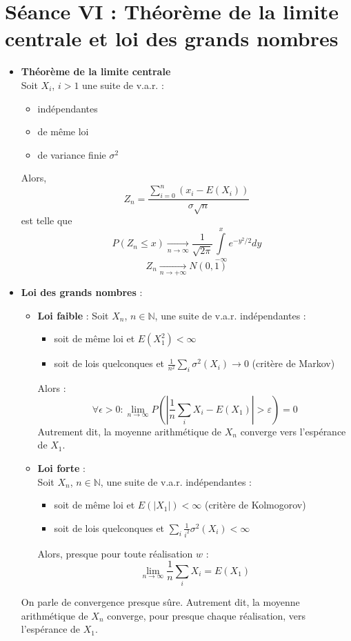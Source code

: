\documentclass[a4paper,11pt]{report}
\begin{document}
\section{Séance VI : Théorème de la limite centrale et loi des grands nombres}
\begin{itemize}
	\item \textbf{Théorème de la limite centrale} \\
	Soit $X_i$, $i>1$ une suite de v.a.r. :
	\begin{itemize}
		\item indépendantes
		\item de même loi
		\item de variance finie $\sigma^2$
	\end{itemize}
	Alors,
	\[
		Z_n = \frac{\sum\limits_{i=0}^{n}{(x_i-E(X_i))}}{\sigma\sqrt{n}}
	\]
	est telle que
	\[
		P(Z_n \le x) \underset{n\rightarrow \infty}\longrightarrow
		\frac1{\sqrt{2\pi}}
		\int\limits_{-\infty}^{x}{e^{-y^2/2}dy}
	\]
	\[
		Z_n \underset{n\to+\infty}{\longrightarrow} N(0,1)
	\]
	\item \textbf{Loi des grands nombres} :
	\begin{itemize}
		\item \textbf{Loi faible} :
		Soit $X_n$, $n \in \mathbb{N}$, une suite de v.a.r. indépendantes :
		\begin{itemize}
			\item soit de même loi et $E(X_1^2) < \infty$
			\item soit de lois quelconques et $\frac{1}{n^2}\sum\limits_{i}{\sigma^2(X_i) \rightarrow 0}$ (critère de Markov)
		\end{itemize}
		Alors :
		\[
			\forall \epsilon>0 : \lim\limits_{n\rightarrow \infty}
			{P\left(\left|\frac{1}{n}\sum\limits_{i}{X_i}-E(X_1)\right|
			>\varepsilon\right)} = 0
		\]
		Autrement dit, la moyenne arithmétique de $X_n$ converge vers l'espérance de $X_1$.
		\item \textbf{Loi forte} :\\
		Soit $X_n$, $n \in \mathbb{N}$, une suite de v.a.r. indépendantes :
		\begin{itemize}
			\item soit de même loi et $E(|X_1|) < \infty$ (critère de Kolmogorov)
			\item soit de lois quelconques et $\sum\limits_{i}{}\frac{1}{i^2}\sigma^2(X_i) < \infty$
		\end{itemize}
		Alors, presque pour toute réalisation $w$ :
		\[
			\lim\limits_{n \rightarrow \infty}
			\frac1n\sum\limits_i{X_i} = E(X_1)
		\]
	\end{itemize}
	On parle de convergence presque sûre.
	Autrement dit, la moyenne arithmétique de $X_n$ converge,
	pour presque chaque réalisation, vers l'espérance de $X_1$.
\end{itemize}
\end{document}
